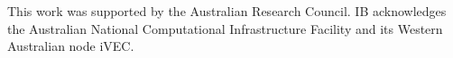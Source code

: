 \documentclass[aip
, pra
, showpacs
, aps
, twocolumn
, groupedaddress
, floatfix
]{revtex4}
\begin{document}
\begin{acknowledgments}
This work was supported by the Australian Research Council. IB
acknowledges the Australian National Computational Infrastructure
Facility and its Western Australian node iVEC.
\end{acknowledgments}





\end{document}
